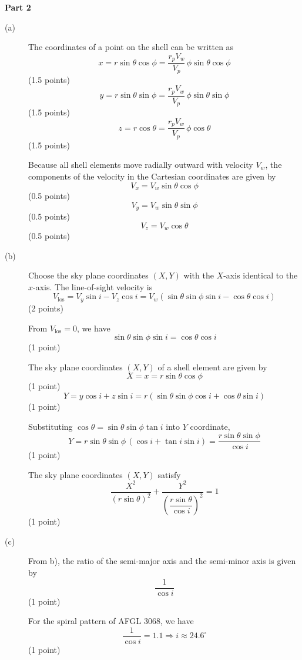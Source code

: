 \noindent\textbf{Part 2}
\begin{description}
\item[(a)] The coordinates of a point on the shell can be written as
  \[ x = r\sin\theta\cos\phi = \frac{r_p V_w}{V_p}\,\phi\sin\theta\cos\phi \]
  \hfill(1.5 points)
  \[ y = r\sin\theta\sin\phi = \frac{r_p V_w}{V_p}\,\phi\sin\theta\sin\phi \]
  \hfill(1.5 points)
  \[ z = r\cos\theta = \frac{r_p V_w}{V_p}\,\phi\cos\theta \]
  \hfill(1.5 points)

  Because all shell elements move radially outward with velocity $V_w$, the
  components of the velocity in the Cartesian coordinates are given by
  \[ V_x = V_w \sin\theta\cos\phi \]
  \hfill(0.5 points)
  \[ V_y = V_w \sin\theta\sin\phi \]
  \hfill(0.5 points)
  \[ V_z = V_w \cos\theta \]
  \hfill(0.5 points)

\item[(b)] Choose the sky plane coordinates $(X, Y)$ with the $X$-axis
  identical to the $x$-axis. The line-of-sight velocity is
  \[ V_{\mathrm{los}} = V_y \sin i - V_z \cos i
     = V_w(\sin\theta\sin\phi\sin i - \cos\theta\cos i) \]
  \hfill(2 points)

  From $V_{\mathrm{los}} = 0$, we have
  \[ \sin\theta\sin\phi\sin i = \cos\theta\cos i \]
  \hfill(1 point)

  The sky plane coordinates $(X, Y)$ of a shell element are given by
  \[ X = x = r\sin\theta\cos\phi \]
  \hfill(1 point)
  \[ Y = y\cos i + z\sin i = r(\sin\theta\sin\phi\cos i + \cos\theta\sin i) \]
  \hfill(1 point)

  Substituting $\cos\theta = \sin\theta\sin\phi\tan i$ into $Y$ coordinate,
  \[ Y = r\sin\theta\sin\phi\,(\cos i + \tan i \sin i)
     = \frac{r\sin\theta\sin\phi}{\cos i} \]
  \hfill(1 point)

  The sky plane coordinates $(X, Y)$ satisfy
  \[ \frac{X^2}{(r\sin\theta)^2}
     + \frac{Y^2}{\left(\dfrac{r\sin\theta}{\cos i}\right)^2} = 1 \]
  \hfill(1 point)

\item[(c)] From b), the ratio of the semi-major axis and the semi-minor axis
  is given by
  \[ \frac{1}{\cos i} \]
  \hfill(1 point)

  For the spiral pattern of AFGL 3068, we have
  \[ \frac{1}{\cos i} = 1.1 \Rightarrow i \approx 24.6^\circ \]
  \hfill(1 point)
\end{description}

